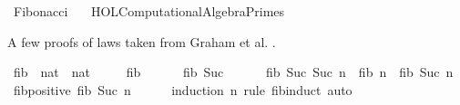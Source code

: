 %
\begin{isabellebody}%
%
%
\isadelimdocument
%
\endisadelimdocument
%
\isatagdocument
%
\isamarkuptrue%
%
\endisatagdocument
{\isafolddocument}%
%
\isadelimdocument
%
\endisadelimdocument
%
\isadelimtheory
%
\endisadelimtheory
%
\isatagtheory
{}\isamarkupfalse%
\ Fibonacci\isanewline
\ \ \ {\isachardoublequoteopen}HOL{\isacharminus}{\kern0pt}Computational{\isacharunderscore}{\kern0pt}Algebra{\isachardot}{\kern0pt}Primes{\isachardoublequoteclose}\isanewline
{}%
\endisatagtheory
{\isafoldtheory}%
%
\isadelimtheory
%
\endisadelimtheory
%
\begin{isamarkuptext}%
A few proofs of laws taken from Graham et al. \cite{concrete-math}.%
\end{isamarkuptext}\isamarkuptrue%
%
\isadelimdocument
%
\endisadelimdocument
%
\isatagdocument
%
\isamarkuptrue%
%
\endisatagdocument
{\isafolddocument}%
%
\isadelimdocument
%
\endisadelimdocument
{}\isamarkupfalse%
\ fib\ {\isacharcolon}{\kern0pt}{\isacharcolon}{\kern0pt}\ {\isachardoublequoteopen}nat\ {\isasymRightarrow}\ nat{\isachardoublequoteclose}\ \isanewline
\ \ \ \ {\isachardoublequoteopen}fib\ {}\ {\isacharequal}{\kern0pt}\ {}{\isachardoublequoteclose}\isanewline
\ \ {\isacharbar}{\kern0pt}\ {\isachardoublequoteopen}fib\ {\isacharparenleft}{\kern0pt}Suc\ {}{\isacharparenright}{\kern0pt}\ {\isacharequal}{\kern0pt}\ {}{\isachardoublequoteclose}\isanewline
\ \ {\isacharbar}{\kern0pt}\ {\isachardoublequoteopen}fib\ {\isacharparenleft}{\kern0pt}Suc\ {\isacharparenleft}{\kern0pt}Suc\ n{\isacharparenright}{\kern0pt}{\isacharparenright}{\kern0pt}\ {\isacharequal}{\kern0pt}\ fib\ n\ {\isacharplus}{\kern0pt}\ fib\ {\isacharparenleft}{\kern0pt}Suc\ n{\isacharparenright}{\kern0pt}{\isachardoublequoteclose}\isanewline
\isanewline
{}\isamarkupfalse%
\ fib{\isacharunderscore}{\kern0pt}positive{\isacharcolon}{\kern0pt}\ {\isachardoublequoteopen}fib\ {\isacharparenleft}{\kern0pt}Suc\ n{\isacharparenright}{\kern0pt}\ {\isachargreater}{\kern0pt}\ {}{\isachardoublequoteclose}\isanewline
%
\isadelimproof
\ \ %
\endisadelimproof
%
\isatagproof
{}\isamarkupfalse%
\ {\isacharparenleft}{\kern0pt}induction\ n\ rule{\isacharcolon}{\kern0pt}\ fib{\isachardot}{\kern0pt}induct{\isacharparenright}{\kern0pt}\ auto%
\endisatagproof
{\isafoldproof}%

\end{isabellebody}
